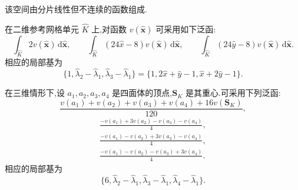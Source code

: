 \begin{example}\label{ex:appendix-b-44}
该空间由分片线性但不连续的函数组成.

在二维参考网格单元 $\widehat K$ 上,对函数 $v(\widehat{\bm x})$ 可采用如下泛函:
\[
 \int_{\widehat K}2v(\widehat{\bm x})\,\mathrm d\widehat{\bm x},\qquad
 \int_{\widehat K}(24\widehat x-8)v(\widehat{\bm x})\,\mathrm d\widehat{\bm x},
 \qquad
 \int_{\widehat K}(24\widehat y-8)v(\widehat{\bm x})\,\mathrm d\widehat{\bm x}.
\]
相应的局部基为
\[
 \{1,\widehat\lambda_2-\widehat\lambda_1,
 \widehat\lambda_3-\widehat\lambda_1\}
 =\{1,2\widehat x+\widehat y-1,\widehat x+2\widehat y-1\}.
\]

在三维情形下,设 $a_1,a_2,a_3,a_4$ 是四面体的顶点,$\bm S_K$ 是其重心.可采用下列泛函:
\[
 \frac{v(a_1)+v(a_2)+v(a_3)+v(a_4)+16v(\bm S_K)}{120},
 \]
 \[
 \begin{gathered}
 \frac{-v(a_1)+3v(a_2)-v(a_3)-v(a_4)}4,\\[3pt]
 \frac{-v(a_1)-v(a_2)+3v(a_3)-v(a_4)}4,\\[3pt]
 \frac{-v(a_1)-v(a_2)-v(a_3)+3v(a_4)}4.
 \end{gathered}
\]
相应的局部基为
\[
 \{6,\widehat\lambda_2-\widehat\lambda_1,
 \widehat\lambda_3-\widehat\lambda_1,
 \widehat\lambda_4-\widehat\lambda_1\}.
\]
\end{example}

